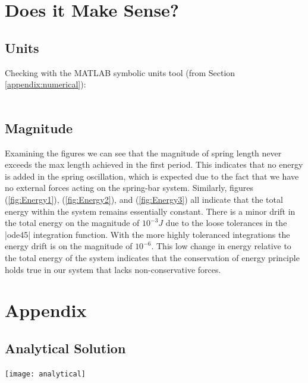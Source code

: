 \documentclass[12pt]{report}
\begin{document}
\begin{flushleft}
\section{Does it Make Sense?}

\subsection{Units}
Checking with the MATLAB symbolic units tool (from Section \ref{appendix:numerical}): \\
~\\

\subsection{Magnitude}
Examining the figures we can see that the magnitude of spring length never exceeds the max length achieved in the first period. This indicates that no energy is added in the spring oscillation, which is expected due to the fact that we have no external forces acting on the spring-bar system. Similarly, figures
(\ref{fig:Energy1}), (\ref{fig:Energy2}), and (\ref{fig:Energy3}) all indicate that the total energy within the system remains essentially constant. There is a minor drift in the total energy on the magnitude of $10^{-3}J$ due to the loose tolerances in the |ode45| integration function. With the more highly toleranced integrations the energy drift is on the magnitude of $10^{-6}$. This low change in energy relative to the total energy of the system indicates that the conservation of energy principle holds true in our system that lacks non-conservative forces.

\section{Appendix} \label{appendix}
\subsection{Analytical Solution}
\center
\texttt{[image: analytical]}
\newpage

\end{flushleft}
\end{document}
